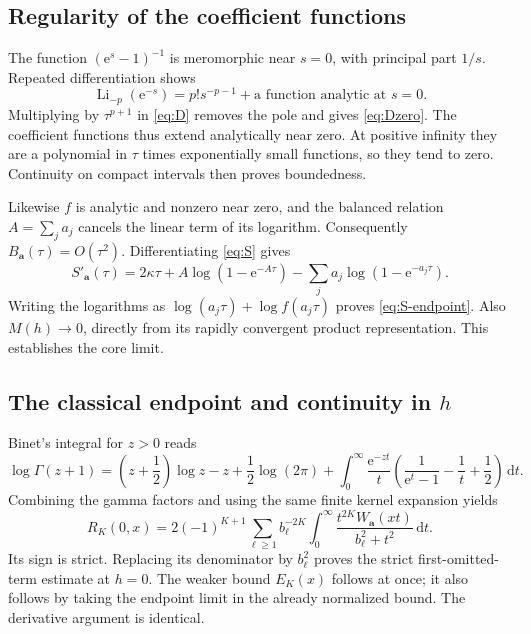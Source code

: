 \documentclass[11pt,a4paper]{article}
\numberwithin{equation}{section}
\theoremstyle{definition}\newtheorem{definition}[theorem]{Definition}
\theoremstyle{remark}\newtheorem{remark}[theorem]{Remark}
\DeclareMathOperator{\Li}{Li}
\newcommand{\e}{\mathrm e}
\newcommand{\dd}{\,\mathrm d}
\newcommand{\avec}{\boldsymbol a}
\begin{document}
\subsection{Regularity of the coefficient functions}
The function $(\e^s-1)^{-1}$ is meromorphic near $s=0$, with principal part
$1/s$. Repeated differentiation shows
\begin{equation}
 \Li_{-p}(\e^{-s})=p!s^{-p-1}+\text{a function analytic at }s=0.
 \label{eq:li-endpoint}
\end{equation}
Multiplying by $\tau^{p+1}$ in \eqref{eq:D} removes the pole and gives
\eqref{eq:Dzero}. The coefficient functions thus extend analytically near zero.
At positive infinity they are a polynomial in $\tau$ times exponentially
small functions, so they tend to zero. Continuity on compact intervals then
proves boundedness.

Likewise $f$ is analytic and nonzero near zero, and the balanced relation
$A=\sum_j a_j$ cancels the linear term of its logarithm. Consequently
$B_{\avec}(\tau)=O(\tau^2)$. Differentiating \eqref{eq:S} gives
\begin{equation}
 S'_{\avec}(\tau)=2\kappa\tau+A\log(1-\e^{-A\tau})
                         -\sum_j a_j\log(1-\e^{-a_j\tau}).
 \label{eq:Sprime}
\end{equation}
Writing the logarithms as $\log(a_j\tau)+\log f(a_j\tau)$ proves
\eqref{eq:S-endpoint}. Also $M(h)\to0$, directly from its rapidly convergent
product representation. This establishes the core limit.

\subsection{The classical endpoint and continuity in \texorpdfstring{$h$}{h}}
Binet's integral for $z>0$ \cite{dlmf-gamma-int} reads
\begin{equation}
 \log\Gamma(z+1)=\left(z+\frac12\right)\log z-z
 +\frac12\log(2\pi)
 +\int_0^\infty\frac{\e^{-zt}}{t}
   \left(\frac1{\e^t-1}-\frac1t+\frac12\right)\dd t.
 \label{eq:Binet}
\end{equation}
Combining the gamma factors and using the same finite kernel expansion yields
\begin{equation}
 R_K(0,x)=2(-1)^{K+1}\sum_{\ell\ge1}b_\ell^{-2K}
 \int_0^\infty\frac{t^{2K}W_{\avec}(xt)}{b_\ell^2+t^2}\dd t.
 \label{eq:Rzero}
\end{equation}
Its sign is strict. Replacing its denominator by $b_\ell^2$ proves the strict
first-omitted-term estimate at $h=0$. The weaker bound $E_K(x)$ follows at once;
it also follows by taking the endpoint limit in the already normalized bound.
The derivative argument is identical.
\end{document}
